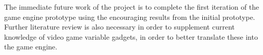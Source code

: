 \documentclass[a4paper]{article}
\begin{document}
The immediate future work of the project is to complete the first iteration of the game engine
prototype using the encouraging results from the initial prototype. Further literature review is
also necessary in order to supplement current knowledge of video game variable gadgets, in order to
better translate these into the game engine.

%




\pagebreak




\end{document}
